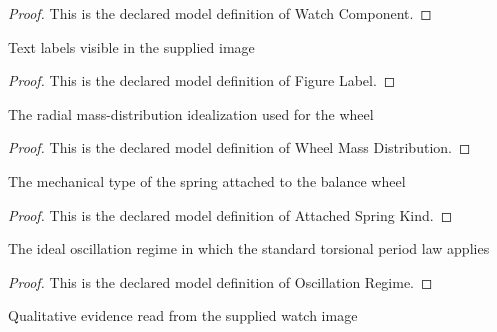 \begin{proof}
  This is the declared model definition of Watch Component.
\end{proof}
\begin{definition}
  \label{def:physics:phyx-mini-0228:phyxminiproblems-problemphyxmini0228-figurelabel}
  Text labels visible in the supplied image
\end{definition}
\begin{proof}
  This is the declared model definition of Figure Label.
\end{proof}
\begin{definition}
  \label{def:physics:phyx-mini-0228:phyxminiproblems-problemphyxmini0228-wheelmassdistribution}
  The radial mass-distribution idealization used for the wheel
\end{definition}
\begin{proof}
  This is the declared model definition of Wheel Mass Distribution.
\end{proof}
\begin{definition}
  \label{def:physics:phyx-mini-0228:phyxminiproblems-problemphyxmini0228-attachedspringkind}
  The mechanical type of the spring attached to the balance wheel
\end{definition}
\begin{proof}
  This is the declared model definition of Attached Spring Kind.
\end{proof}
\begin{definition}
  \label{def:physics:phyx-mini-0228:phyxminiproblems-problemphyxmini0228-oscillationregime}
  The ideal oscillation regime in which the standard torsional period law applies
\end{definition}
\begin{proof}
  This is the declared model definition of Oscillation Regime.
\end{proof}
\begin{definition}
  \label{def:physics:phyx-mini-0228:phyxminiproblems-problemphyxmini0228-balancewheelfigure}
  Qualitative evidence read from the supplied watch image
\end{definition}
